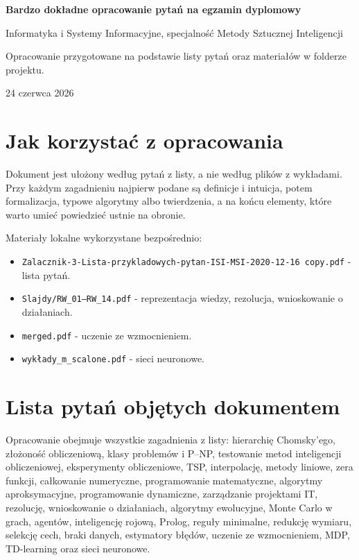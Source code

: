 \documentclass[11pt,a4paper]{article}
\begin{document}
\begin{titlepage}
  \centering
  {\Huge\bfseries Bardzo dokładne opracowanie pytań na egzamin dyplomowy\par}
  \vspace{0.6cm}
  {\Large Informatyka i Systemy Informacyjne, specjalność Metody Sztucznej Inteligencji\par}
  \vspace{1.2cm}
  {\large Opracowanie przygotowane na podstawie listy pytań oraz materiałów w folderze projektu.\par}
  \vfill
  {\large 24 czerwca 2026\par}
\end{titlepage}

\tableofcontents
\newpage

\section*{Jak korzystać z opracowania}

Dokument jest ułożony według pytań z listy, a nie według plików z wykładami. Przy każdym zagadnieniu najpierw podane są definicje i intuicja, potem formalizacja, typowe algorytmy albo twierdzenia, a na końcu elementy, które warto umieć powiedzieć ustnie na obronie.

Materiały lokalne wykorzystane bezpośrednio:
\begin{itemize}
  \item \texttt{Zalacznik-3-Lista-przykladowych-pytan-ISI-MSI-2020-12-16 copy.pdf} - lista pytań.
  \item \texttt{Slajdy/RW\_01--RW\_14.pdf} - reprezentacja wiedzy, rezolucja, wnioskowanie o działaniach.
  \item \texttt{merged.pdf} - uczenie ze wzmocnieniem.
  \item \texttt{wykłady\_m\_scalone.pdf} - sieci neuronowe.
\end{itemize}

\section*{Lista pytań objętych dokumentem}

Opracowanie obejmuje wszystkie zagadnienia z listy: hierarchię Chomsky'ego, złożoność obliczeniową, klasy problemów i P--NP, testowanie metod inteligencji obliczeniowej, eksperymenty obliczeniowe, TSP, interpolację, metody liniowe, zera funkcji, całkowanie numeryczne, programowanie matematyczne, algorytmy aproksymacyjne, programowanie dynamiczne, zarządzanie projektami IT, rezolucję, wnioskowanie o działaniach, algorytmy ewolucyjne, Monte Carlo w grach, agentów, inteligencję rojową, Prolog, reguły minimalne, redukcję wymiaru, selekcję cech, braki danych, estymatory błędów, uczenie ze wzmocnieniem, MDP, TD-learning oraz sieci neuronowe.








\end{document}
